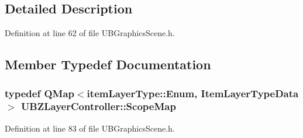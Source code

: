 \subsection{Detailed Description}


Definition at line 62 of file U\-B\-Graphics\-Scene.\-h.



\subsection{Member Typedef Documentation}
\hypertarget{class_u_b_z_layer_controller_a67dfc701ad2ecd2815ca091be35a9dc0}{
\subsubsection[{Scope\-Map}]{\setlength{\rightskip}{0pt plus 5cm}typedef Q\-Map$<${\bf item\-Layer\-Type\-::\-Enum}, {\bf Item\-Layer\-Type\-Data}$>$ {\bf U\-B\-Z\-Layer\-Controller\-::\-Scope\-Map}}}\label{d7/dd6/class_u_b_z_layer_controller_a67dfc701ad2ecd2815ca091be35a9dc0}


Definition at line 83 of file U\-B\-Graphics\-Scene.\-h.



